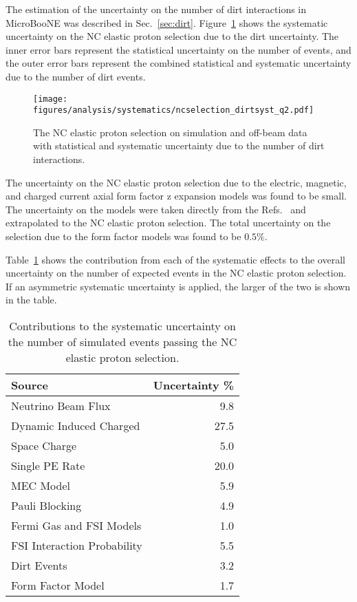     The estimation of the uncertainty on the number of dirt interactions in
    MicroBooNE was described in Sec.~\ref{sec:dirt}. Figure~\ref{fig:systdirt}
    shows the systematic uncertainty on the NC elastic proton selection due to
    the dirt uncertainty. The inner error bars represent the statistical
    uncertainty on the number of events, and the outer error bars represent the
    combined statistical and systematic uncertainty due to the number of dirt
    events.
    \begin{figure}[ht]
      \centering
      \texttt{[image: figures/analysis/systematics/ncselection\_dirtsyst\_q2.pdf]}
      \caption{The NC elastic proton selection on simulation and off-beam data
      with statistical and systematic uncertainty due to the number of dirt
      interactions.}
      \label{fig:systdirt}
    \end{figure}

    The uncertainty on the NC elastic proton selection due to the electric,
    magnetic, and charged current axial form factor z expansion models was
    found to be small. The uncertainty on the models were taken directly from
    the Refs.~\cite{Ye:2017gyb,Meyer:2016oeg} and extrapolated to the NC elastic
    proton selection. The total uncertainty on the selection due to the form
    factor models was found to be $0.5\%$.

    Table~\ref{tab:systuncertainties} shows the contribution from each of the
    systematic effects to the overall uncertainty on the number of expected
    events in the NC elastic proton selection. If an asymmetric systematic
    uncertainty is applied, the larger of the two is shown in the table.
    \begin{table}[ht]
      \caption{Contributions to the systematic uncertainty on the number of
      simulated events passing the NC elastic proton selection.
      \label{tab:systuncertainties}}
      \centering
      \begin{tabularx}{9cm}{ l r }
        \hline
        Source & Uncertainty \% \\
        \hline
        Neutrino Beam Flux & 9.8 \\
        \hline
        Dynamic Induced Charged & 27.5 \\
        Space Charge & 5.0 \\
        Single PE Rate & 20.0 \\
        \hline
        MEC Model & 5.9 \\
        Pauli Blocking & 4.9 \\
        Fermi Gas and FSI Models & 1.0 \\
        FSI Interaction Probability & 5.5 \\
        \hline
        Dirt Events & 3.2 \\
        \hline
        Form Factor Model & 1.7 \\
        \hline
      \end{tabularx}
    \end{table}

